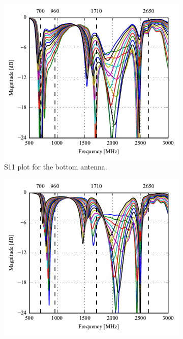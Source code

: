 \begin{figure}[htbp]
   \begin{subfigure}[b]{0.49\linewidth}
        \centering
        \includegraphics{img/tech_sol/monopole/s11}
        \caption{S11 plot for the bottom antenna.}
        \label{fig:ant1_s11}
    \end{subfigure}
    \hfill
    \begin{subfigure}[b]{0.49\linewidth}
        \centering
        \includegraphics{img/tech_sol/monopole/s22}

\end{subfigure}
\end{figure}
